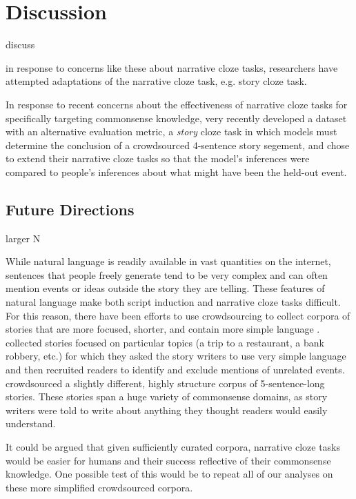 \documentclass[10pt,a4paper]{article}
\newcommand{\todo}[1]{{\color{red}#1}}
\begin{document}
\section{Discussion}

\todo{discuss}

\todo{in response to concerns like these about narrative cloze tasks, researchers have attempted adaptations of the narrative cloze task, e.g. story cloze task.}

In response to recent concerns about the effectiveness of narrative cloze tasks for specifically targeting commonsense knowledge,  very recently developed a dataset with an alternative evaluation metric, a {\em story} cloze task in which models must determine the conclusion of a crowdsourced 4-sentence story segement, and  chose to extend their narrative cloze tasks so that the model's inferences were compared to people's inferences about what might have been the held-out event.

\subsection{Future Directions}

\todo{larger N}

While natural language is readily available in vast quantities on the internet, sentences that people freely generate tend to be very complex and can often mention events or ideas outside the story they are telling. These features of natural language make both script induction and narrative cloze tasks difficult. For this reason, there have been efforts to use crowdsourcing to collect corpora of stories that are more focused, shorter, and contain more simple language \cite{li2013story, mostafazadeh2016corpus}.  collected stories focused on particular topics (a trip to a restaurant, a bank robbery, etc.) for which they asked the story writers to use very simple language and then recruited readers to identify and exclude mentions of unrelated events.  crowdsourced a slightly different, highly structure corpus of 5-sentence-long stories. These stories span a huge variety of commonsense domains, as story writers were told to write about anything they thought readers would easily understand.

It could be argued that given sufficiently curated corpora, narrative cloze tasks would be easier for humans and their success reflective of their commonsense knowledge. One possible test of this would be to repeat all of our analyses on these more simplified crowdsourced corpora.
\end{document}
